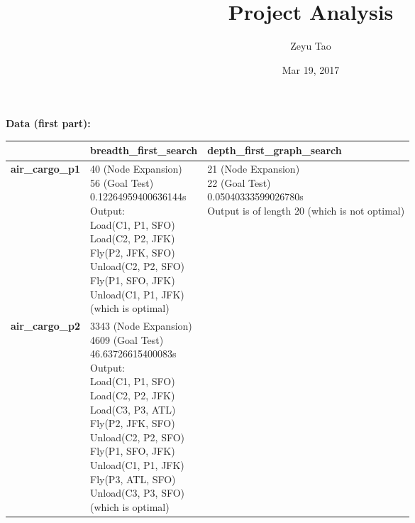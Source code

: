 \documentclass{article}
\title{Project Analysis}
\author{Zeyu Tao}
\date{Mar 19, 2017}
\begin{document}
   \maketitle
   \textbf{Data (first part):}\\
  \begin{center}
    \begin{tabular}{ | l | p{6cm} | p{6cm} | }
      \hline
       & \textbf{breadth\_first\_search} & \textbf{depth\_first\_graph\_search} \\ \hline
      \textbf{air\_cargo\_p1}
      &
      \parbox[t]{6cm}{40 (Node Expansion)\\56 (Goal Test)\\0.12264959400636144s \\}
      \parbox[t]{6cm}{
      Output:\\
        Load(C1, P1, SFO)\\
        Load(C2, P2, JFK)\\
        Fly(P2, JFK, SFO)\\
        Unload(C2, P2, SFO)\\
        Fly(P1, SFO, JFK)\\
        Unload(C1, P1, JFK)\\
        (which is optimal)\\
        }
      &
      \parbox[t]{6cm}{21 (Node Expansion)\\22 (Goal Test)\\0.05040333599026780s \\}
      Output is of length 20 (which is not optimal)
      \\ \hline
      \textbf{air\_cargo\_p2}
      &
      \parbox[t]{6cm}{3343 (Node Expansion)\\4609 (Goal Test)\\46.63726615400083s \\}
    \parbox[t]{6cm}{
    Output:\\
      Load(C1, P1, SFO)\\
      Load(C2, P2, JFK)\\
      Load(C3, P3, ATL)\\
      Fly(P2, JFK, SFO)\\
      Unload(C2, P2, SFO)\\
      Fly(P1, SFO, JFK)\\
      Unload(C1, P1, JFK)\\
      Fly(P3, ATL, SFO)\\
      Unload(C3, P3, SFO)\\
      (which is optimal)\\
}
\end{tabular}
\end{center}
\end{document}
